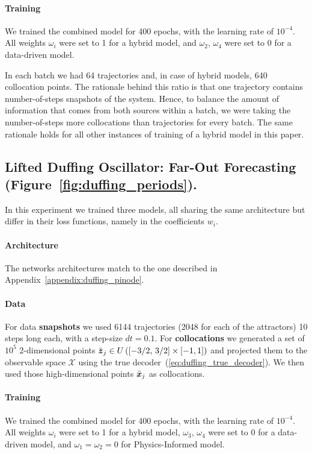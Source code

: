 \paragraph{Training} We trained the combined model for 400 epochs, with the learning rate of $10^{-4}$. All weights $\omega_i$ were set to 1 for a hybrid model, and $\omega_2$, $\omega_4$ were set to 0 for a data-driven model. 

In each batch we had 64 trajectories and, in case of hybrid models, 640 collocation points. The rationale behind this ratio is that one trajectory contains number-of-steps snapshots of the system. Hence, to balance the amount of information that comes from both sources within a batch, we were taking the number-of-steps more collocations than trajectories for every batch. The same rationale holds for all other instances of training of a hybrid model in this paper.

\subsection{Lifted Duffing Oscillator: Far-Out Forecasting (Figure~\ref{fig:duffing_periods}).}
\label{appendix:duffing_forecast}
In this experiment we trained three models, all sharing the same architecture but differ in their loss functions, namely in the coefficients $w_i$.

\paragraph{Architecture} The networks architectures match to the one described in Appendix~\ref{appendix:duffing_pinode}.
\paragraph{Data} For data \textbf{snapshots} we used 6144 trajectories (2048 for each of the attractors) 10 steps long each, with a step-size $dt = 0.1$. For \textbf{collocations} we generated a set of $10^5$ 2-dimensional points $\bar{\boldsymbol{z}}_j \in U\left([-3/2,\, 3/2] \times [-1, 1]\right)$ and projected them to the observable space $\mathcal{X}$ using the true decoder~(\ref{eq:duffing_true_decoder}). We then used those high-dimensional points $\bar{\boldsymbol{x}}_j$ as collocations. 

\paragraph{Training} We trained the combined model for 400 epochs, with the learning rate of $10^{-4}$. All weights $\omega_i$ were set to 1 for a hybrid model, $\omega_3$, $\omega_4$ were set to 0 for a data-driven model, and $\omega_1 = \omega_2 = 0$ for Physics-Informed model. 

